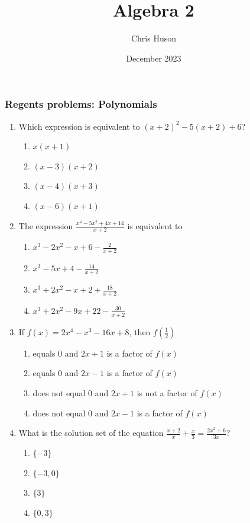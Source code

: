 \documentclass[12pt, twoside]{article}
\title{Algebra 2}
\author{Chris Huson}
\date{December 2023}
\begin{document}
\subsubsection*{Regents problems: Polynomials}
\begin{enumerate}[itemsep=0.5cm]
\item Which expression is equivalent to $(x + 2)^2 - 5(x + 2) + 6$?
\begin{enumerate}
    \item $x(x + 1)$
    \item $(x - 3)(x + 2)$
    \item $(x - 4)(x + 3)$
    \item $(x - 6)(x + 1)$
\end{enumerate}

\item The expression $\displaystyle \frac{x^4 - 5x^2 + 4x + 14}{x+2}$ is equivalent to
\begin{enumerate}
    \item $\displaystyle x^3 - 2x^2 - x + 6 - \frac{2}{x + 2}$
    \item $\displaystyle x^3 - 5x + 4 - \frac{14}{x + 2}$
    \item $\displaystyle x^3 + 2x^2 - x + 2 + \frac{18}{x + 2}$
    \item $\displaystyle x^3 + 2x^2 - 9x + 22 - \frac{30}{x + 2}$
\end{enumerate}

\item If \(f(x) = 2x^4 - x^3 - 16x + 8\), then \(f\left(\frac{1}{2}\right)\)
\begin{enumerate}
    \item equals 0 and \(2x + 1\) is a factor of \(f(x)\)
    \item equals 0 and \(2x - 1\) is a factor of \(f(x)\)
    \item does not equal 0 and \(2x + 1\) is not a factor of \(f(x)\)
    \item does not equal 0 and \(2x - 1\) is a factor of \(f(x)\)
\end{enumerate}

\item What is the solution set of the equation \(\displaystyle \frac{x+2}{x} + \frac{x}{3} = \frac{2x^2+6}{3x}\)?
\begin{enumerate}
    \item \(\{-3\}\)
    \item \(\{-3, 0\}\)
    \item \(\{3\}\)
    \item \(\{0, 3\}\)
\end{enumerate}


\end{enumerate}
\end{document}
